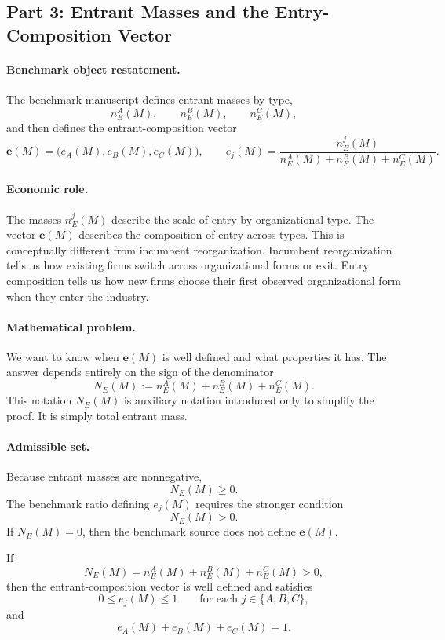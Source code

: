 \subsection{Part 3: Entrant Masses and the Entry-Composition Vector}

\paragraph{Benchmark object restatement.}
The benchmark manuscript defines entrant masses by type,
\[
n_E^A(M),\qquad n_E^B(M),\qquad n_E^C(M),
\]
and then defines the entrant-composition vector
\[
\mathbf e(M)=\bigl(e_A(M),e_B(M),e_C(M)\bigr),
\qquad
e_j(M)=\frac{n_E^j(M)}{n_E^A(M)+n_E^B(M)+n_E^C(M)}.
\]

\paragraph{Economic role.}
The masses $n_E^j(M)$ describe the scale of entry by organizational type. The vector $\mathbf e(M)$ describes the composition of entry across types. This is conceptually different from incumbent reorganization. Incumbent reorganization tells us how existing firms switch across organizational forms or exit. Entry composition tells us how new firms choose their first observed organizational form when they enter the industry.

\paragraph{Mathematical problem.}
We want to know when $\mathbf e(M)$ is well defined and what properties it has. The answer depends entirely on the sign of the denominator
\[
N_E(M):=n_E^A(M)+n_E^B(M)+n_E^C(M).
\]
This notation $N_E(M)$ is auxiliary notation introduced only to simplify the proof. It is simply total entrant mass.

\paragraph{Admissible set.}
Because entrant masses are nonnegative,
\[
N_E(M)\ge 0.
\]
The benchmark ratio defining $e_j(M)$ requires the stronger condition
\[
N_E(M)>0.
\]
If $N_E(M)=0$, then the benchmark source does not define $\mathbf e(M)$.

\begin{proposition}
If
\[
N_E(M)=n_E^A(M)+n_E^B(M)+n_E^C(M)>0,
\]
then the entrant-composition vector is well defined and satisfies
\[
0\le e_j(M)\le 1
\qquad\text{for each }j\in\{A,B,C\},
\]
and
\[
e_A(M)+e_B(M)+e_C(M)=1.
\]
\end{proposition}


